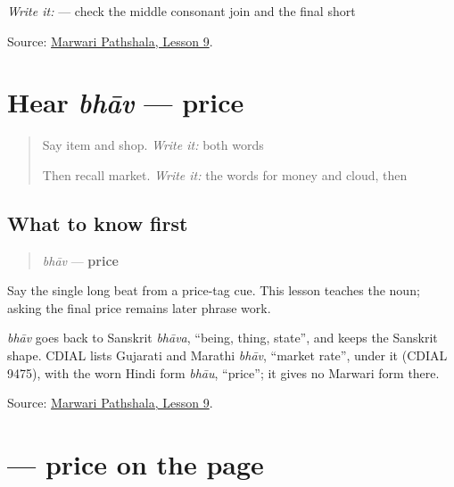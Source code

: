 \emph{Write it:} \textbf{} — check the middle consonant join and the final short \textbf{}

\begin{tcolorbox}[breakable,colback=teal!4,colframe=teal!35!black,title={Before you move on}]
Source: \href{https://www.marwaripathshala.com/marwari-lesson-9-english}{Marwari Pathshala, Lesson 9}.
\end{tcolorbox}
\section[bhāv]{Hear \emph{bhāv} — price}

\label{lesson:MW-C13-hear-bhaav}



\begin{quote}
Say item and shop. \emph{Write it:} both words

Then recall market. \emph{Write it:} the words for money and cloud, then \textbf{}
\end{quote}

\subsection*{What to know first}
\begin{quote}
\emph{bhāv} — \textbf{price}
\end{quote}

Say the single long beat from a price-tag cue. This lesson teaches the noun; asking the final price remains later phrase work.

\begin{cousinweb}
\emph{bhāv} goes back to Sanskrit \emph{bhāva}, \textquotedblleft{}being, thing, state\textquotedblright{}, and keeps the Sanskrit shape. CDIAL lists Gujarati and Marathi \emph{bhāv}, \textquotedblleft{}market rate\textquotedblright{}, under it (CDIAL 9475), with the worn Hindi form \emph{bhāu}, \textquotedblleft{}price\textquotedblright{}; it gives no Marwari form there.
\end{cousinweb}

\begin{tcolorbox}[breakable,colback=teal!4,colframe=teal!35!black,title={Before you move on}]
Source: \href{https://www.marwaripathshala.com/marwari-lesson-9-english}{Marwari Pathshala, Lesson 9}.
\end{tcolorbox}
\section[\texorpdfstring{\mw{भाव} (bhāv)}{भाव (bhāv)}]{ — price on the page}

